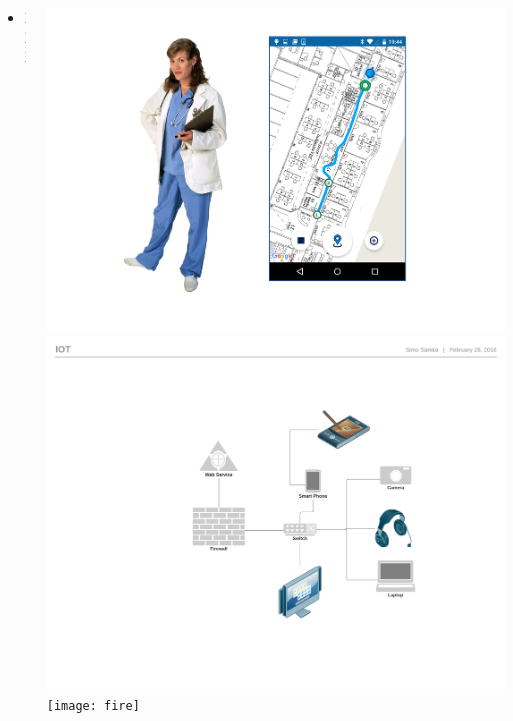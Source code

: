 \documentclass[xcolor=svgnames,english,handout]{beamer}
\begin{document}
\begin{frame}
  \begin{columns}
  \begin{column}{0.7\textwidth}
  \begin{itemize}[<+->]       
  \item XXX
  \end{itemize}
  \end{column}
  \begin{column}{0.3\textwidth}
  \includegraphics[width=0.8\columnwidth]{nurse_nav} \\
  \includegraphics[width=0.8\columnwidth]{IoT} \\
  \texttt{[image: fire]}
  \end{column}
  \end{columns}
\end{frame}
\end{document}
